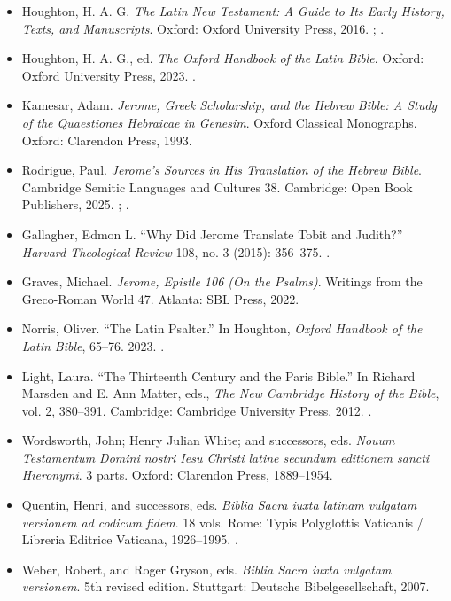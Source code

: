 \begin{itemize}
\item Houghton, H. A. G. \emph{The Latin New Testament: A Guide to Its Early History, Texts, and Manuscripts}. Oxford: Oxford University Press, 2016. ; .
\item Houghton, H. A. G., ed. \emph{The Oxford Handbook of the Latin Bible}. Oxford: Oxford University Press, 2023. .
\item Kamesar, Adam. \emph{Jerome, Greek Scholarship, and the Hebrew Bible: A Study of the Quaestiones Hebraicae in Genesim}. Oxford Classical Monographs. Oxford: Clarendon Press, 1993.
\item Rodrigue, Paul. \emph{Jerome's Sources in His Translation of the Hebrew Bible}. Cambridge Semitic Languages and Cultures 38. Cambridge: Open Book Publishers, 2025. ; .
\item Gallagher, Edmon L. ``Why Did Jerome Translate Tobit and Judith?'' \emph{Harvard Theological Review} 108, no. 3 (2015): 356--375. .
\item Graves, Michael. \emph{Jerome, Epistle 106 (On the Psalms)}. Writings from the Greco-Roman World 47. Atlanta: SBL Press, 2022.
\item Norris, Oliver. ``The Latin Psalter.'' In Houghton, \emph{Oxford Handbook of the Latin Bible}, 65--76. 2023. .
\item Light, Laura. ``The Thirteenth Century and the Paris Bible.'' In Richard Marsden and E. Ann Matter, eds., \emph{The New Cambridge History of the Bible}, vol. 2, 380--391. Cambridge: Cambridge University Press, 2012. .
\item Wordsworth, John; Henry Julian White; and successors, eds. \emph{Nouum Testamentum Domini nostri Iesu Christi latine secundum editionem sancti Hieronymi}. 3 parts. Oxford: Clarendon Press, 1889--1954.
\item Quentin, Henri, and successors, eds. \emph{Biblia Sacra iuxta latinam vulgatam versionem ad codicum fidem}. 18 vols. Rome: Typis Polyglottis Vaticanis / Libreria Editrice Vaticana, 1926--1995. .
\item Weber, Robert, and Roger Gryson, eds. \emph{Biblia Sacra iuxta vulgatam versionem}. 5th revised edition. Stuttgart: Deutsche Bibelgesellschaft, 2007.
\end{itemize}
